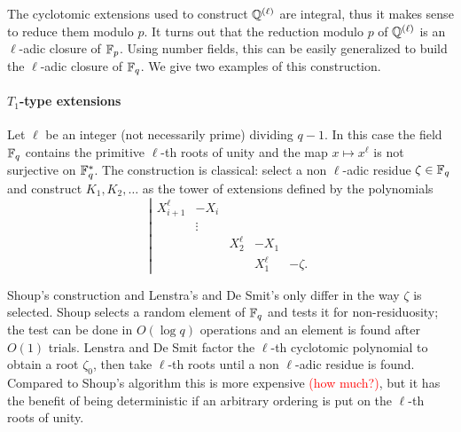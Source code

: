 \documentclass{sig-alternate}
\newcommand{\todo}[1]{\textcolor{red}{(#1)}}
\begin{document}
The cyclotomic extensions used to construct $\mathbb{Q}^{(\ell)}$ are
integral, thus it makes sense to reduce them modulo $p$. It turns out
that the reduction modulo $p$ of $\mathbb{Q}^{(\ell)}$ is an $\ell$-adic
closure of $\mathbb{F}_p$. Using number fields, this can be easily generalized
to build the $\ell$-adic closure of $\mathbb{F}_q$. We give two examples of
this construction.

\paragraph{$T_1$-type extensions}
Let $\ell$ be an integer (not necessarily prime) dividing $q-1$. In
this case the field $\mathbb{F}_q$ contains the primitive $\ell$-th roots of
unity and the map $x\mapsto x^{\ell}$ is not surjective on
$\mathbb{F}_q^\ast$. The construction is classical: select a non $\ell$-adic
residue $\zeta\in\mathbb{F}_q$ and construct $K_1,K_2,\dots$ as the tower of
extensions defined by the polynomials
\begin{equation}
  \label{eq:T1}
  \left|
  \begin{array}{rrrrr}
    X_{i+1}^\ell &- X_i\\
    &\vdots\\
    &&X_2^\ell &- X_1\\
              &&&X_1^\ell &- \zeta.
  \end{array}
  \right.
\end{equation}

Shoup's construction and Lenstra's and De Smit's only differ in the
way $\zeta$ is selected. Shoup selects a random element of $\mathbb{F}_q$ and
tests it for non-residuosity; the test can be done in $O(\log q)$
operations and an element is found after $O(1)$ trials. Lenstra and De
Smit factor the $\ell$-th cyclotomic polynomial to obtain a root
$\zeta_0$, then take $\ell$-th roots until a non $\ell$-adic residue
is found. Compared to Shoup's algorithm this is more expensive
\todo{how much?}, but it has the benefit of being deterministic if an
arbitrary ordering is put on the $\ell$-th roots of unity.
\end{document}
